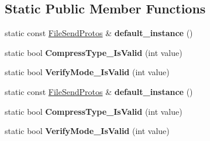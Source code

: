 \subsection*{Static Public Member Functions}
\begin{DoxyCompactItemize}
\item 
\mbox{\label{classruntime_1_1FileSendProtos_a37878b1a301ce2ef2f46eb1f22c00827}} 
static const \hyperlink{classruntime_1_1FileSendProtos}{File\+Send\+Protos} \& {\bfseries default\+\_\+instance} ()
\item 
\mbox{\label{classruntime_1_1FileSendProtos_ae1fd438c045041a86cffd6375cf7aad7}} 
static bool {\bfseries Compress\+Type\+\_\+\+Is\+Valid} (int value)
\item 
\mbox{\label{classruntime_1_1FileSendProtos_a7de13dffc0c01e2f6ed46cb318435fb3}} 
static bool {\bfseries Verify\+Mode\+\_\+\+Is\+Valid} (int value)
\item 
\mbox{\label{classruntime_1_1FileSendProtos_a3461f745d8f1a451e3d828aabf5a86d0}} 
static const \hyperlink{classruntime_1_1FileSendProtos}{File\+Send\+Protos} \& {\bfseries default\+\_\+instance} ()
\item 
\mbox{\label{classruntime_1_1FileSendProtos_ae1fd438c045041a86cffd6375cf7aad7}} 
static bool {\bfseries Compress\+Type\+\_\+\+Is\+Valid} (int value)
\item 
\mbox{\label{classruntime_1_1FileSendProtos_a7de13dffc0c01e2f6ed46cb318435fb3}} 
static bool {\bfseries Verify\+Mode\+\_\+\+Is\+Valid} (int value)
\end{DoxyCompactItemize}
